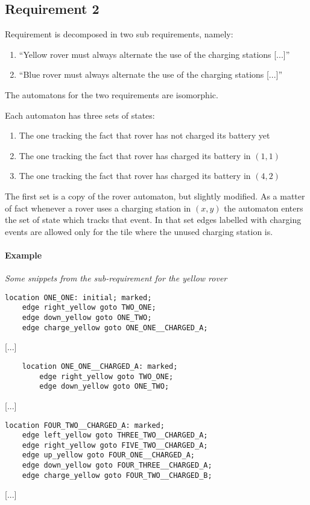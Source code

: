 \documentclass{article}
\begin{document}
\subsection{Requirement 2}
Requirement is decomposed in two sub requirements, namely:
\begin{enumerate}
    \item ``Yellow rover must always alternate the use of the charging stations [...]''
    \item ``Blue rover must always alternate the use of the charging stations [...]''
\end{enumerate}
The automatons for the two requirements are isomorphic.

Each automaton has three sets of states:
\begin{enumerate}
    \item The one tracking the fact that rover has not charged its battery yet
    \item The one tracking the fact that rover has charged its battery in $(1,1)$
    \item The one tracking the fact that rover has charged its battery in $(4,2)$
\end{enumerate}

The first set is a copy of the rover automaton, but slightly modified.
As a matter of fact whenever a rover uses a charging station in $(x, y)$
the automaton enters the set of state which tracks that event.
In that set edges labelled with charging events are allowed only
for the tile where the unused charging station is.

\paragraph{Example}
\textit{Some snippets from the sub-requirement for the yellow rover}
\begin{verbatim}
location ONE_ONE: initial; marked;
    edge right_yellow goto TWO_ONE;
    edge down_yellow goto ONE_TWO;
    edge charge_yellow goto ONE_ONE__CHARGED_A;
\end{verbatim}
[...]
\begin{verbatim}
    location ONE_ONE__CHARGED_A: marked;
        edge right_yellow goto TWO_ONE;
        edge down_yellow goto ONE_TWO;
\end{verbatim}
[...]
\begin{verbatim}
location FOUR_TWO__CHARGED_A: marked;
    edge left_yellow goto THREE_TWO__CHARGED_A;
    edge right_yellow goto FIVE_TWO__CHARGED_A;
    edge up_yellow goto FOUR_ONE__CHARGED_A;
    edge down_yellow goto FOUR_THREE__CHARGED_A;
    edge charge_yellow goto FOUR_TWO__CHARGED_B;
\end{verbatim}
[...]
\end{document}
